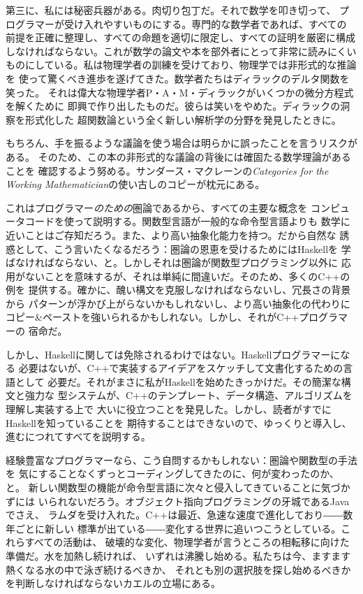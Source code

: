 第三に、私には秘密兵器がある。肉切り包丁だ。それで数学を叩き切って、
プログラマーが受け入れやすいものにする。専門的な数学者であれば、すべての
前提を正確に整理し、すべての命題を適切に限定し、すべての証明を厳密に構成
しなければならない。これが数学の論文や本を部外者にとって非常に読みにくい
ものにしている。私は物理学者の訓練を受けており、物理学では非形式的な推論を
使って驚くべき進歩を遂げてきた。数学者たちはディラックのデルタ関数を笑った。
それは偉大な物理学者P・A・M・ディラックがいくつかの微分方程式を解くために
即興で作り出したものだ。彼らは笑いをやめた。ディラックの洞察を形式化した
超関数論という全く新しい解析学の分野を発見したときに。

もちろん、手を振るような議論を使う場合は明らかに誤ったことを言うリスクがある。
そのため、この本の非形式的な議論の背後には確固たる数学理論があることを
確認するよう努める。サンダース・マクレーンの\emph{Categories for the Working
  Mathematician}の使い古しのコピーが枕元にある。

これはプログラマー\emph{のための}圏論であるから、すべての主要な概念を
コンピュータコードを使って説明する。関数型言語が一般的な命令型言語よりも
数学に近いことはご存知だろう。また、より高い抽象化能力を持つ。だから自然な
誘惑として、こう言いたくなるだろう：圏論の恩恵を受けるためにはHaskellを
学ばなければならない、と。しかしそれは圏論が関数型プログラミング以外に
応用がないことを意味するが、それは単純に間違いだ。そのため、多くのC++の例を
提供する。確かに、醜い構文を克服しなければならないし、冗長さの背景から
パターンが浮かび上がらないかもしれないし、より高い抽象化の代わりに
コピー\&ペーストを強いられるかもしれない。しかし、それがC++プログラマーの
宿命だ。

しかし、Haskellに関しては免除されるわけではない。Haskellプログラマーになる
必要はないが、C++で実装するアイデアをスケッチして文書化するための言語として
必要だ。それがまさに私がHaskellを始めたきっかけだ。その簡潔な構文と強力な
型システムが、C++のテンプレート、データ構造、アルゴリズムを理解し実装する上で
大いに役立つことを発見した。しかし、読者がすでにHaskellを知っていることを
期待することはできないので、ゆっくりと導入し、進むにつれてすべてを説明する。

経験豊富なプログラマーなら、こう自問するかもしれない：圏論や関数型の手法を
気にすることなくずっとコーディングしてきたのに、何が変わったのか、と。
新しい関数型の機能が命令型言語に次々と侵入してきていることに気づかずには
いられないだろう。オブジェクト指向プログラミングの牙城であるJavaでさえ、
ラムダを受け入れた。C++は最近、急速な速度で進化しており――数年ごとに新しい
標準が出ている――変化する世界に追いつこうとしている。これらすべての活動は、
破壊的な変化、物理学者が言うところの相転移に向けた準備だ。水を加熱し続ければ、
いずれは沸騰し始める。私たちは今、ますます熱くなる水の中で泳ぎ続けるべきか、
それとも別の選択肢を探し始めるべきかを判断しなければならないカエルの立場にある。

